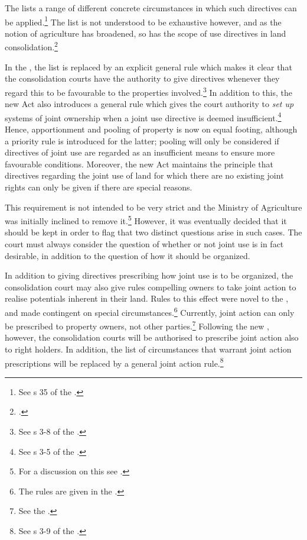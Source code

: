 The \cite{lca79} lists a range of different concrete circumstances in which such directives can be applied.\footnote{See s 35 of the \cite{lca79}.} The list is not understood to be exhaustive however, and as the notion of agriculture has broadened, so has the scope of use directives in land consolidation.\footcite[103]{otprp57}

In the \cite{lca13}, the list is replaced by an explicit general rule which makes it clear that the  consolidation courts have the authority to give directives whenever they regard this to be favourable to the properties involved.\footnote{See s 3-8 of the \cite{lca13}.} In addition to this, the new Act also introduces a general rule which gives the court authority to \emph{set up} systems of joint ownership when a joint use directive is deemed insufficient.\footnote{See s 3-5 of the \cite{lca13}.} Hence, apportionment and pooling of property is now on equal footing, although a priority rule is introduced for the latter; pooling will only be considered if directives of joint use are regarded as an insufficient means to ensure more favourable conditions. Moreover, the new Act maintains the principle that directives regarding the joint use of land for which there are no existing joint rights can only be given if there are special reasons.

This requirement is not intended to be very strict and the Ministry of Agriculture was initially inclined to remove it.\footnote{For a discussion on this see \cite[140-141]{prop12}.} However, it was eventually decided that it should be kept in order to flag that two distinct questions arise in such cases. The court must always consider the question of whether or not joint use is in fact desirable, in addition to the question of how it should be organized.

In addition to giving directives prescribing how joint use is to be organized, the consolidation court may also give rules compelling owners to take joint action to realise potentials inherent in their land. Rules to this effect were novel to the \cite{lca79}, and made contingent on special circumstances.\footnote{The rules are given in the \cite[2 e)|42-44]{lca79}.} Currently, joint action can only be prescribed to property owners, not other parties.\footnote{See the \cite[34 a)]{lca79}.} Following the new \cite{lca13}, however, the consolidation courts will be authorised to prescribe joint action also to right holders. In addition, the list of circumstances that warrant joint action prescriptions will be replaced by a general joint action rule.\footnote{See s 3-9 of the \cite{lca13}.}


